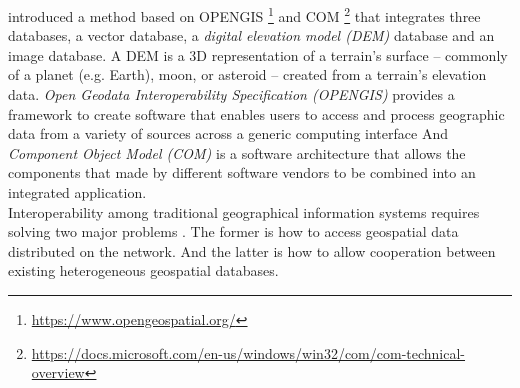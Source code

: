 \documentclass[12pt,a4paper]{report}
\newcommand{\term}{\textit}
\newcommand{\acr}{\MakeUppercase}
\begin{document}
	\citet{Jian} introduced a method based on \acr{opengis} \footnote{ \url{https://www.opengeospatial.org/}} and \acr{com} \footnote{ \url{https://docs.microsoft.com/en-us/windows/win32/com/com-technical-overview}} that integrates three databases, a vector database, a \term{digital elevation model (\acr{dem})} database and an image database. A \acr{dem} is a 3D representation of a terrain's surface – commonly of a planet (e.g. Earth), moon, or asteroid – created from a terrain's elevation data. \term{Open Geodata Interoperability Specification (\acr{opengis})} provides a framework to create software that enables users to access and process geographic data from a variety of sources across a generic computing interface And \term{Component Object Model (\acr{com})} is a software architecture that allows the components that made by different software vendors to be combined into an integrated application. 
	\\

	Interoperability among traditional geographical information systems requires solving two major problems \citep{Gong}. The former is how to access geospatial data distributed on the network. And the latter is how to allow cooperation between existing heterogeneous geospatial databases.
	\\

	\renewcommand{\bibname}{References}
	
	
\end{document}

